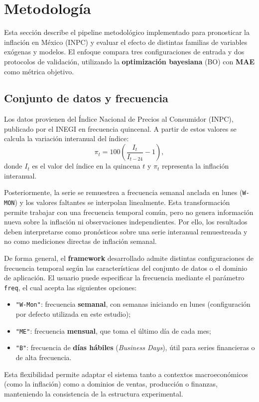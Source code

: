 \documentclass[12pt,letterpaper]{article}
\begin{document}
\newpage
\section{Metodología}

Esta sección describe el pipeline metodológico implementado para pronosticar la inflación en México (INPC) y evaluar el efecto de distintas familias de variables exógenas y modelos. El enfoque compara tres configuraciones de entrada y dos protocolos de validación, utilizando la \textbf{optimización bayesiana} (BO) con \textbf{MAE} como métrica objetivo.

\subsection{Conjunto de datos y frecuencia}

Los datos provienen del Índice Nacional de Precios al Consumidor (INPC),
publicado por el INEGI en frecuencia quincenal. A partir de estos valores se
calcula la variación interanual del índice:
\begin{equation}
    \pi_t = 100\left(\frac{I_t}{I_{t-24}}-1\right),
\end{equation}
donde $I_t$ es el valor del índice en la quincena $t$ y $\pi_t$ representa
la inflación interanual.

Posteriormente, la serie se remuestrea a frecuencia semanal anclada en lunes
(\texttt{W-MON}) y los valores faltantes se interpolan linealmente. Esta
transformación permite trabajar con una frecuencia temporal común, pero
no genera información nueva sobre la inflación ni observaciones independientes.
Por ello, los resultados deben interpretarse como pronósticos sobre una serie
interanual remuestreada y no como mediciones directas de inflación semanal.

De forma general, el \textbf{framework} desarrollado admite distintas configuraciones de frecuencia temporal según las características del conjunto de datos o el dominio de aplicación.  
El usuario puede especificar la frecuencia mediante el parámetro \texttt{freq}, el cual acepta las siguientes opciones:
\begin{itemize}
    \item \texttt{"W-Mon"}: frecuencia \textbf{semanal}, con semanas iniciando en lunes (configuración por defecto utilizada en este estudio);
    \item \texttt{"ME"}: frecuencia \textbf{mensual}, que toma el último día de cada mes;
    \item \texttt{"B"}: frecuencia de \textbf{días hábiles} (\textit{Business Days}), útil para series financieras o de alta frecuencia.
\end{itemize}
Esta flexibilidad permite adaptar el sistema tanto a contextos macroeconómicos (como la inflación) como a dominios de ventas, producción o finanzas, manteniendo la consistencia de la estructura experimental.
\end{document}

